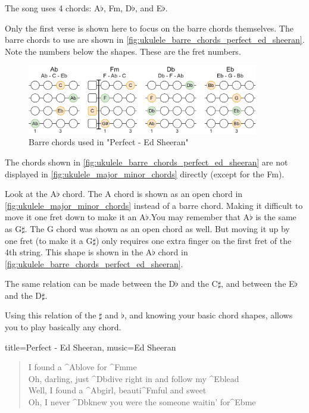 The song uses 4 chords: A$\flat$, Fm, D$\flat$, and E$\flat$.

Only the first verse is shown here to focus on the barre chords themselves. The barre chords to use are shown in \autoref{fig:ukulele_barre_chords_perfect_ed_sheeran}. Note the numbers below the shapes. These are the fret numbers.


\begin{figure}[h]
	\centering
	\includegraphics[width=0.9\textwidth]{../../Images/UkuleleChordsUsedInPerfectEdSheeran.png}
	\caption{Barre chords used in "Perfect - Ed Sheeran"}
	\label{fig:ukulele_barre_chords_perfect_ed_sheeran}
\end{figure}

The chords shown in \autoref{fig:ukulele_barre_chords_perfect_ed_sheeran} are not displayed in \autoref{fig:ukulele_major_minor_chords} directly (except for the Fm). 

Look at the A$\flat$ chord. The A chord is shown as an open chord in \autoref{fig:ukulele_major_minor_chords} instead of a barre chord. Making it difficult to move it one fret down to make it an A$\flat$.You may remember that A$\flat$ is the same as G$\sharp$. The G chord was shown as an open chord as well. But moving it up by one fret (to make it a G$\sharp$) only requires one extra finger on the first fret of the 4th string. This shape is shown in the A$\flat$ chord in \autoref{fig:ukulele_barre_chords_perfect_ed_sheeran}.

The same relation can be made between the D$\flat$ and the C$\sharp$, and between the E$\flat$ and the D$\sharp$.

Using this relation of the $\sharp$ and $\flat$, and knowing your basic chord shapes, allows you to play basically any chord.

\begin{song}[verse/numbered, align-chords=l]{title={Perfect - Ed Sheeran}, music={Ed Sheeran}}
	\begin{verse}
		I found a ^{Ab}love for ^{Fm}me \\
		Oh, darling, just ^{Db}dive right in and follow my ^{Eb}lead \\
		Well, I found a ^{Ab}girl, beauti^{Fm}ful and sweet \\
		Oh, I never ^{Db}knew you were the someone waitin' for^{Eb}me \\
	\end{verse}
\end{song}

